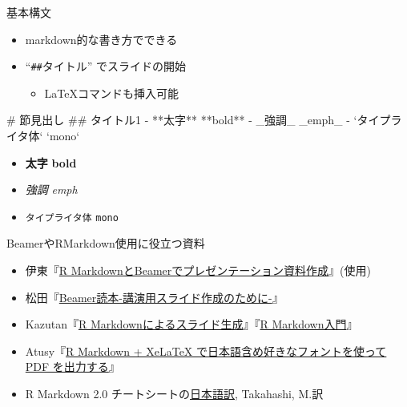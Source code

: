 \documentclass[
  12pt,
  ignorenonframetext,
]{beamer}
\newenvironment{Shaded}{\begin{snugshade}}{\end{snugshade}}
\newcommand{\BaseNTok}[1]{\textcolor[rgb]{0.00,0.00,0.81}{#1}}
\newcommand{\FunctionTok}[1]{\textcolor[rgb]{0.00,0.00,0.00}{#1}}
\newcommand{\NormalTok}[1]{#1}
\newcommand{\StringTok}[1]{\textcolor[rgb]{0.31,0.60,0.02}{#1}}
\providecommand{\tightlist}{%
  \setlength{\itemsep}{0pt}\setlength{\parskip}{0pt}}
\begin{document}
\begin{frame}[fragile]{基本構文}
\protect\hypertarget{ux57faux672cux69cbux6587}{}

\begin{itemize}
\tightlist
\item
  markdown的な書き方でできる
\item
  ``\texttt{\#\#}タイトル'' でスライドの開始

  \begin{itemize}
  \tightlist
  \item
    \LaTeX コマンドも挿入可能
  \end{itemize}
\end{itemize}

\begin{Shaded}
\begin{Highlighting}[]
\FunctionTok{# 節見出し}
\FunctionTok{## タイトル1}
\NormalTok{- **太字** **bold**}
\NormalTok{- }\StringTok{_強調_ _emph_}
\StringTok{- }\BaseNTok{`タイプライタ体`}\StringTok{ }\BaseNTok{`mono`}
\end{Highlighting}
\end{Shaded}

\begin{itemize}
\tightlist
\item
  \textbf{太字} \textbf{bold}
\item
  \emph{強調} \emph{emph}
\item
  \texttt{タイプライタ体} \texttt{mono}
\end{itemize}

\end{frame}

\begin{frame}{BeamerやRMarkdown使用に役立つ資料}
\protect\hypertarget{beamerux3084rmarkdownux4f7fux7528ux306bux5f79ux7acbux3064ux8cc7ux6599}{}

\begin{itemize}
\tightlist
\item
  伊東『\href{https://www.slideshare.net/hirokito/r-markdownbeamer-88777082}{R
  MarkdownとBeamerでプレゼンテーション資料作成}』(\LuaLaTeX 使用)
\item
  松田『\href{http://ayapin-film.sakura.ne.jp/LaTeX/slides.html\#beamer}{Beamer読本-講演用スライド作成のために-}』
\item
  Kazutan『\href{https://kazutan.github.io/SappoRoR6/rmd_slide.html\#/}{R
  Markdownによるスライド生成}』『\href{https://kazutan.github.io/kazutanR/Rmd_intro.html}{R
  Markdown入門}』
\item
  Atusy『\href{https://blog.atusy.net/2019/05/14/rmd2pdf-any-font/}{R
  Markdown + XeLaTeX で日本語含め好きなフォントを使って PDF
  を出力する}』
\item
  R Markdown 2.0
  チートシートの\href{https://rstudio.com/wp-content/uploads/2016/11/Rmarkdown-cheatsheet-2.0_ja.pdf}{日本語訳},
  Takahashi, M.訳
\end{itemize}

\end{frame}
\end{document}
